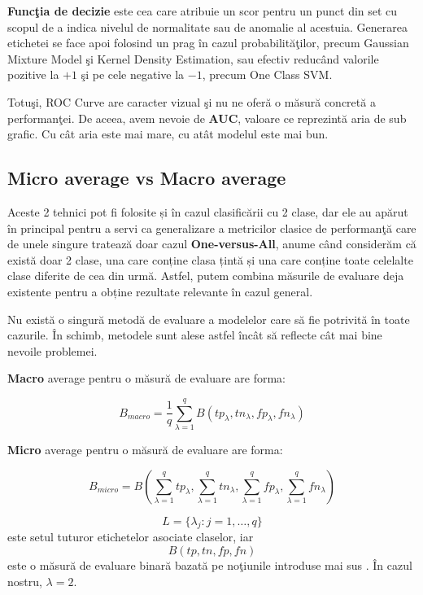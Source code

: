 \textbf{Funcţia de decizie} este cea care atribuie un scor pentru 
un punct din set cu scopul de a indica nivelul de normalitate sau de anomalie 
al acestuia. Generarea etichetei se face apoi folosind un prag în cazul 
probabilităţilor, precum Gaussian Mixture Model şi Kernel Density Estimation, 
sau efectiv reducând valorile pozitive la $+1$ şi pe cele negative la $-1$,
precum One Class SVM.

Totuşi, ROC Curve are caracter vizual şi nu ne oferă o măsură concretă a performanţei.
De aceea, avem nevoie de \textbf{AUC}, valoare ce reprezintă aria de sub grafic. Cu cât aria
este mai mare, cu atât modelul este mai bun.

\subsection{Micro average vs Macro average}

Aceste 2 tehnici pot fi folosite și în cazul clasificării cu 2 clase, dar 
ele au apărut în principal pentru a servi ca generalizare a metricilor 
clasice de performanţă care de unele singure tratează 
doar cazul \textbf{One-versus-All}, anume 
când considerăm că există doar 2 clase,
una care conține clasa țintă și una care 
conține toate celelalte clase diferite de cea din urmă. Astfel, putem 
combina măsurile de evaluare deja existente pentru a obține 
rezultate relevante în cazul general.

Nu există o singură metodă de evaluare a modelelor care să fie potrivită în toate 
cazurile. În schimb, metodele sunt alese astfel încât să reflecte cât mai bine 
nevoile problemei.

\textbf{Macro} average pentru o măsură de evaluare are forma:

\begin{equation}
    B_{macro}=\frac{1}{q} \sum_{\lambda=1}^{q} B(tp_{\lambda}, tn_{\lambda}, fp_{\lambda},
fn_{\lambda})
\end{equation}

\textbf{Micro} average pentru o măsură de evaluare are forma:

\begin{equation}
    B_{micro}=B(\sum_{\lambda=1}^{q} tp_{\lambda}, \sum_{\lambda=1}^{q} tn_{\lambda}, 
\sum_{\lambda=1}^{q} fp_{\lambda}, \sum_{\lambda=1}^{q} fn_{\lambda})
\end{equation}

$$L=\{\lambda_{j}: j=1,\dots,q \}$$ 
este setul tuturor etichetelor asociate claselor, iar 
$$B(tp, tn, fp, fn)$$ este o măsură de evaluare binară bazată pe noţiunile introduse mai sus
\cite{Asch2013MacroandME}.
În cazul nostru, $\lambda=2$.


